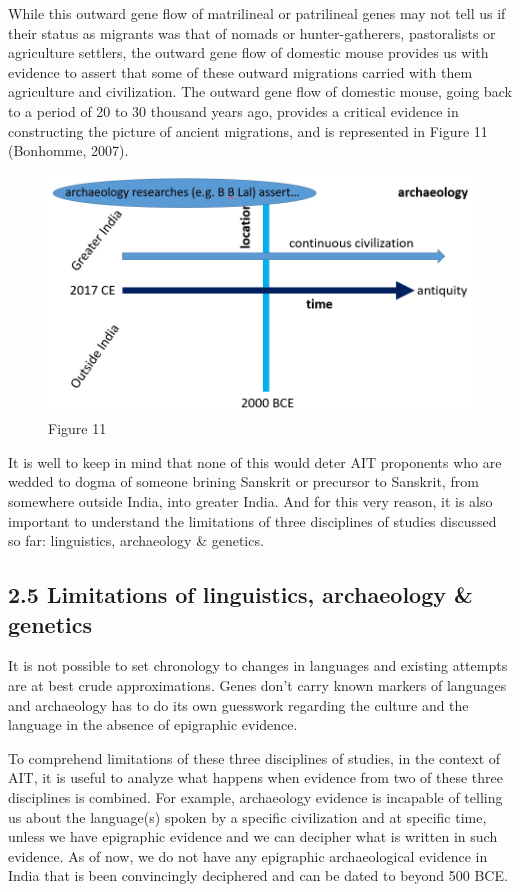 While this outward gene flow of matrilineal or patrilineal genes may not tell us if their status as migrants was that of nomads or hunter-gatherers, pastoralists or agriculture settlers, the outward gene flow of domestic mouse provides us with evidence to assert that some of these outward migrations carried with them agriculture and civilization. The outward gene flow of domestic mouse, going back to a period of 20 to 30 thousand years ago, provides a critical evidence in constructing the picture of ancient migrations, and is represented in Figure 11 (Bonhomme, 2007).

\begin{figure}
\includegraphics{"images/8-11.jpg"}
\caption{Figure 11}
\end{figure}

It is well to keep in mind that none of this would deter AIT proponents who are wedded to dogma of someone brining Sanskrit or precursor to Sanskrit, from somewhere outside India, into greater India. And for this very reason, it is also important to understand the limitations of three disciplines of studies discussed so far: linguistics, archaeology \& genetics.


\subsection{2.5 Limitations of linguistics, archaeology \& genetics}

It is not possible to set chronology to changes in languages and existing attempts are at best crude approximations. Genes don’t carry known markers of languages and archaeology has to do its own guesswork regarding the culture and the language in the absence of epigraphic evidence.

To comprehend limitations of these three disciplines of studies, in the context of AIT, it is useful to analyze what happens when evidence from two of these three disciplines is combined. For example, archaeology evidence is incapable of telling us about the language(s) spoken by a specific civilization and at specific time, unless we have epigraphic evidence and we can decipher what is written in such evidence. As of now, we do not have any epigraphic archaeological evidence in India that is been convincingly deciphered and can be dated to beyond 500 BCE.

